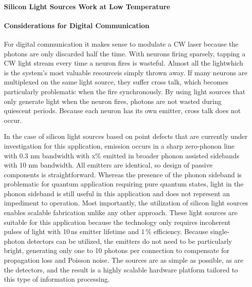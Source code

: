 \paragraph{Silicon Light Sources Work at Low Temperature}

\cite{enpo1985}

\cite{brha1986}

\paragraph{Considerations for Digital Communication}
\vspace{3em}
For digital communication it makes sense to modulate a CW laser because the photons are only discarded half the time. With neurons firing sparsely, tapping a CW light stream every time a neuron fires is wasteful. Almost all the light\textemdash which is the system's most valuable resource\textemdash is simply thrown away. If many neurons are multiplexed on the same light source, they suffer cross talk, which becomes particularly problematic when the fire synchronously. By using light sources that only generate light when the neuron fires, photons are not wasted during quiescent periods. Because each neuron has its own emitter, cross talk does not occur. 

In the case of silicon light sources based on point defects that are currently under investigation for this application, emission occurs in a sharp zero-phonon line with 0.3 nm bandwidth with x\% emitted in broader phonon assisted sidebands with 10 nm bandwidth. All emitters are identical, so design of passive components is straightforward. Whereas the presence of the phonon sideband is problematic for quantum application requiring pure quantum states, light in the phonon sideband is still useful in this application and does not represent an impediment to operation. Most importantly, the utilization of silicon light sources enables scalable fabrication unlike any other approach. These light sources are suitable for this application because the technology only requires incoherent pulses of light with 10\,ns emitter lifetime and 1\,\% efficiency. Because single-photon detectors can be utilized, the emitters do not need to be particularly bright, generating only one to 10 photons per connection to compensate for propagation loss and Poisson noise. The sources are as simple as possible, as are the detectors, and the result is a highly scalable hardware platform tailored to this type of information processing.


